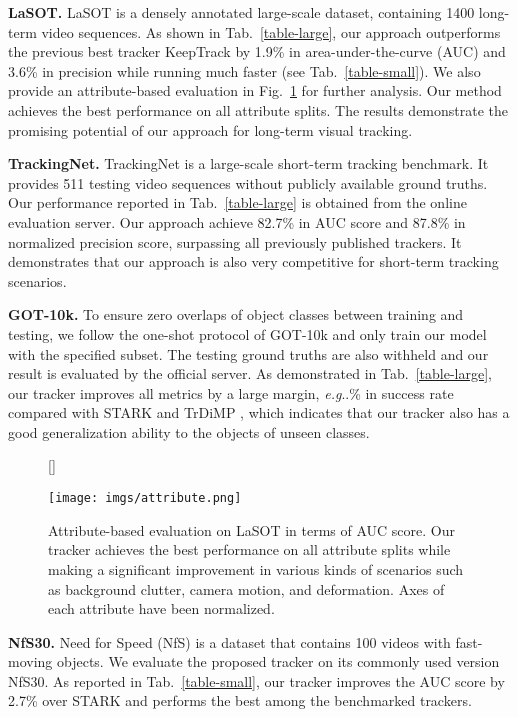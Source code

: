 \documentclass[runningheads]{llncs}
\makeatletter
\DeclareRobustCommand\onedot{\futurelet\@let@token\@onedot}
\def\@onedot{\ifx\@let@token.\else.\null\fi\xspace}
\def\eg{\emph{e.g}\onedot} \def\Eg{\emph{E.g}\onedot}
\makeatother
\begin{document}
\noindent\textbf{LaSOT.} LaSOT \cite{fan2019lasot} is a densely annotated large-scale dataset, containing 1400 long-term video sequences. As shown in Tab.~\ref{table-large}, our approach outperforms the previous best tracker KeepTrack \cite{mayer2021learning} by 1.9\% in area-under-the-curve (AUC) and 3.6\% in precision while running much faster (see Tab.~\ref{table-small}). We also provide an attribute-based evaluation in Fig.~\ref{figure-attribute} for further analysis. Our method achieves the best performance on all attribute splits. The results demonstrate the promising potential of our approach for long-term visual tracking.

\noindent\textbf{TrackingNet.} TrackingNet \cite{muller2018trackingnet} is a large-scale short-term tracking benchmark. It provides 511 testing video sequences without publicly available ground truths. Our performance reported in Tab.~\ref{table-large} is obtained from the online evaluation server. Our approach achieve 82.7\% in AUC score and 87.8\% in normalized precision score, surpassing all previously published trackers. It demonstrates that our approach is also very competitive for short-term tracking scenarios.

\noindent\textbf{GOT-10k.} To ensure zero overlaps of object classes between training and testing, we follow the one-shot protocol of GOT-10k \cite{huang2019got} and only train our model with the specified subset. The testing ground truths are also withheld and our result is evaluated by the official server. As demonstrated in Tab.~\ref{table-large}, our tracker improves all metrics by a large margin, \eg 2.3\% in success rate compared with STARK \cite{yan2021learning} and TrDiMP \cite{wang2021transformer}, which indicates that our tracker also has a good generalization ability to the objects of unseen classes.

\begin{figure}[t]
[\FBwidth]
{\caption{Attribute-based evaluation on LaSOT in terms of AUC score. Our tracker achieves the best performance on all attribute splits while making a significant improvement in various kinds of scenarios such as background clutter, camera motion, and deformation. Axes of each attribute have been normalized.}
\label{figure-attribute}}
{\texttt{[image: imgs/attribute.png]}}
\end{figure}

\noindent\textbf{NfS30.} Need for Speed (NfS) \cite{kiani2017need} is a dataset that contains 100 videos with fast-moving objects. We evaluate the proposed tracker on its commonly used version NfS30. As reported in Tab.~\ref{table-small}, our tracker improves the AUC score by 2.7\% over STARK \cite{yan2021learning} and performs the best among the benchmarked trackers.
\end{document}
